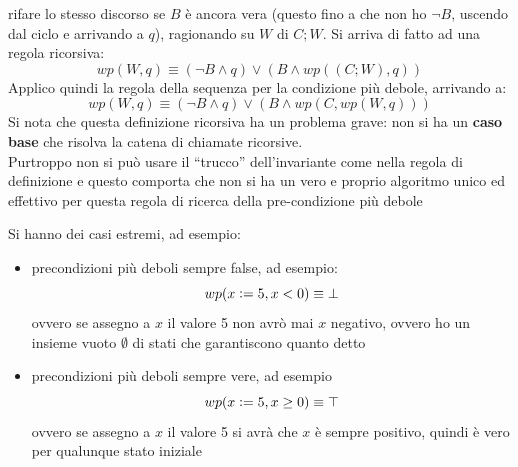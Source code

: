 \begin{itemize}
				      					      rifare lo stesso discorso se $B$ è ancora vera (questo fino a che non ho $\neg
				      					      B$, uscendo dal ciclo e arrivando a $q$), ragionando su $W$ di $C;W$. Si
				      					      arriva di fatto ad una regola ricorsiva:
				      					      \[wp(W, q)\equiv(\neg B\land q)\lor(B\land wp((C;W), q))\]
				      					      Applico quindi la regola della sequenza per la condizione più debole,
				      					      arrivando a:
				      					      \[wp(W, q)\equiv(\neg B\land q)\lor(B\land wp(C, wp(W, q)))\]
				      					      Si nota che questa definizione ricorsiva ha un problema grave: non si ha un
				      					      \textbf{caso base} che risolva la catena di chiamate ricorsive.\\
				      					      Purtroppo non si può usare il ``trucco'' dell'invariante come nella regola di
				      					      definizione e questo comporta che non si ha un vero e proprio algoritmo unico
				      					      ed effettivo per questa regola di ricerca della pre-condizione più debole
				      				\end{itemize}
				      				Si hanno dei casi estremi, ad esempio:
				      				\begin{itemize}
				      					\item precondizioni più deboli sempre false, ad esempio:
				      					      \[wp(x\cceq5, x<0)\equiv\bot\]
				      					      ovvero se assegno a $x$ il valore 5 non avrò mai $x$ negativo,
				      					      ovvero ho un insieme vuoto $\emptyset$ di stati che garantiscono quanto detto
				      					\item precondizioni più deboli sempre vere, ad esempio
				      					      \[wp(x\cceq 5, x\geq0)\equiv\top\]
				      					      ovvero se assegno a $x$ il valore 5 si avrà che $x$ è sempre
				      					      positivo, quindi è vero per qualunque stato iniziale
				      				\end{itemize}
